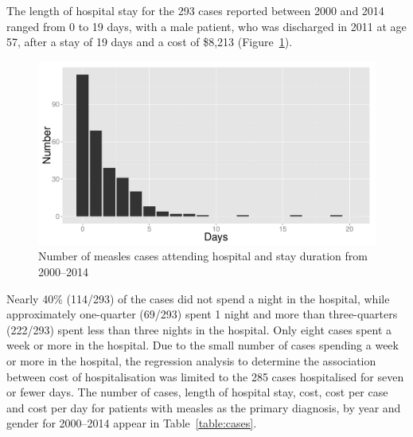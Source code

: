 \documentclass{article}
\begin{document}
The length of hospital stay for the 293 cases reported between 2000 and 2014 ranged from 0 to 19 days, with a male patient, who was discharged in 2011 at age 57, after a stay of 19 days and a cost of \$8,213 (Figure~\ref{fig:hosp}).


\begin{figure}[h!]
\begin{center}
\includegraphics{interimreport2-029}
\end{center}
\caption{Number of measles cases attending hospital and stay duration from 2000--2014}
\label{fig:hosp}
\end{figure}

Nearly 40\% (114/293) of the cases did not spend a night in the hospital, while approximately one-quarter (69/293) spent 1 night and more than three-quarters (222/293) spent less than three nights in the hospital. Only eight cases spent a week or more in the hospital. Due to the small number of cases spending a week or more in the hospital, the regression analysis to determine the association between cost of hospitalisation was limited to the 285 cases hospitalised for seven or fewer days. The number of cases, length of hospital stay, cost, cost per case and cost per day for patients with measles as the primary diagnosis, by year and gender for 2000--2014 appear in Table~\ref{table:cases}.
\end{document}
